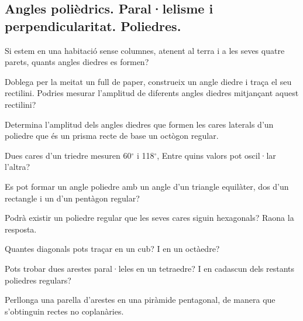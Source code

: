 \begin{activitats}


\subsection{Angles polièdrics. Paral·lelisme i perpendicularitat. Poliedres.}

\begin{mylist}


\exer Si estem en una habitació sense columnes, atenent al terra i a les seves quatre parets, quants angles diedres es formen?

\exer  Doblega per la meitat un full de paper, construeix un angle diedre i traça el seu rectilini. Podries mesurar l'amplitud de diferents angles diedres mitjançant aquest rectilini?

\exer  Determina l'amplitud dels angles diedres que formen les cares laterals d'un poliedre que és un prisma recte de base un octògon regular.

\exer  Dues cares d'un triedre mesuren 60${}^\circ$ i 118${}^\circ$, Entre quins valors pot oscil·lar l'altra?

\exer  Es pot formar un angle poliedre amb un angle d'un triangle equilàter, dos d'un rectangle i un d'un pentàgon regular?

\exer  Podrà existir un poliedre regular que les seves cares siguin hexagonals? Raona la resposta.

\exer  Quantes diagonals pots traçar en un cub? I en un octàedre?

\exer  Pots trobar dues arestes paral·leles en un tetraedre? I en cadascun dels restants poliedres regulars?

\exer  Perllonga una parella d'arestes en una piràmide pentagonal, de manera que s'obtinguin rectes no coplanàries.


\end{mylist}
\end{activitats}
